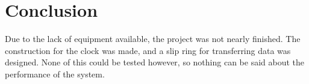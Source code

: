 \section{Conclusion} 
Due to the lack of equipment available, the project was not nearly finished.
The construction for the clock was made, and a slip ring for transferring data was designed.
None of this could be tested however, so nothing can be said about the performance of the system.